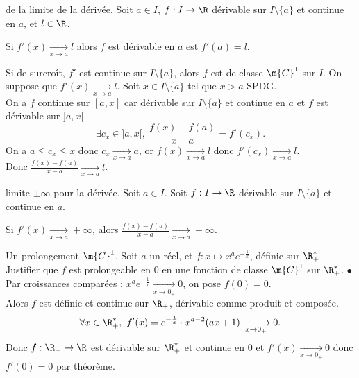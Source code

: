 \documentclass[11pt]{article}
\begin{document}
\begin{thm}{de la limite de la dérivée.}{}
    Soit $a\in I$, $f:I\to\R$ dérivable sur $I\setminus\{a\}$ et continue en $a$, et $l\in\R$.
    \begin{center}
        Si $f'(x)\xrightarrow[x\to a]{}l$ alors $f$ est dérivable en $a$ est $f'(a)=l$.
    \end{center}
    Si de surcroît, $f'$ est continue sur $I\setminus\{a\}$, alors $f$ est de classe $\m{C}^1$ sur $I$.
    \tcblower
    On suppose que $f'(x)\xrightarrow[x\to a]{}l$. Soit $x\in I\setminus\{a\}$ tel que $x>a$ SPDG.\\
    On a $f$ continue sur $[a,x]$ car dérivable sur $I\setminus\{a\}$ et continue en $a$ et $f$ est dérivable sur $]a,x[$.
    \begin{equation*}
        \exists c_x \in ]a,x[, ~ \frac{f(x)-f(a)}{x-a} = f'(c_x).
    \end{equation*}
    On a $a\leq c_x \leq x$ donc $c_x\xrightarrow[x\to a]{}a$, or $f(x)\xrightarrow[x\to a]{}l$ donc $f'(c_x)\xrightarrow[x\to a]{}l$.\\
    Donc $\frac{f(x)-f(a)}{x-a}\xrightarrow[x\to a]{}l$.
\end{thm}

\begin{prop}{limite $\pm\infty$ pour la dérivée.}{}
    Soit $a\in I$. Soit $f:I\to\R$ dérivable sur $I\setminus\{a\}$ et continue en $a$.
    \begin{center}
        Si $f'(x)\xrightarrow[x\to a]{}+\infty$, alors $\frac{f(x)-f(a)}{x-a}\xrightarrow[x\to a]{}+\infty$.
    \end{center}
\end{prop}

\begin{ex}{Un prolongement $\m{C}^1$.}{}
    Soit $a$ un réel, et $f:x\mapsto x^ae^{-\frac{1}{x}}$, définie sur $\R_+^*$.\\
    Justifier que $f$ est prolongeable en 0 en une fonction de classe $\m{C}^1$ sur $\R_+^*$.
    \tcblower
    $\bullet$ Par croissances comparées : $x^ae^{-\frac{1}{x}}\xrightarrow[x\to0_+]{}0$, on pose $f(0)=0$.\\
    Alors $f$ est définie et continue sur $\R_+$, dérivable comme produit et composée.
    \begin{equation*}
        \forall x \in \R_+^*, ~ f'(x)=e^{-\frac{1}{x}}\cdot x^{a-2}(ax+1)\xrightarrow[x\to0_+]{}0.
    \end{equation*}
    Donc $f:\R_+\to\R$ est dérivable sur $\R_+^*$ et continue en 0 et $f'(x)\xrightarrow[x\to0_+]{}0$ donc $f'(0)=0$ par théorème.
\end{ex}
\end{document}
